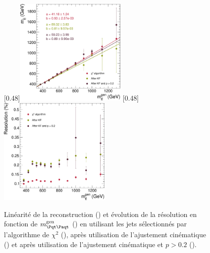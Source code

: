 \begin{figure}[tbp] \centering
    \subcaptionbox{\label{fig:mtt_response_kf_all}}[0.48\textwidth]{\includegraphics[width=0.48\textwidth]{chapitre6/figs/kinfit/mtt_response_vs_gen_comparison_kf_all_events.pdf}} \hfill
    \subcaptionbox{\label{fig:mtt_reso_vs_mtt_gen_kf_all}}[0.48\textwidth]{\includegraphics[width=0.48\textwidth]{chapitre6/figs/kinfit/mtt_resolution_vs_gen_comparison_kf_all_events.pdf}}
    \caption{Linéarité de la reconstruction () et évolution de la résolution en fonction de $\mtt^\text{gen}$ () en utilisant les jets sélectionnés par l'algorithme de $\chi^2$ (\rouge), après utilisation de l'ajustement cinématique (\vertc) et après utilisation de l'ajustement cinématique et $p > \num{0.2}$ (\violet).}
    \label{fig:mtt_resp_reso_kf_all_events}
\end{figure}

